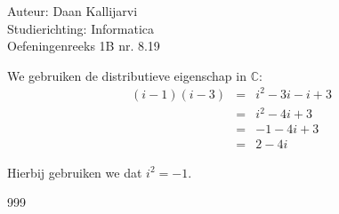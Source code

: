 \documentclass[a4paper]{article}
\begin{document}
\noindent \large Auteur: Daan Kallijarvi \\
\noindent \large Studierichting: Informatica\\
\noindent \large Oefeningenreeks 1B nr. 8.19\\

\medskip

\normalsize

We gebruiken de distributieve eigenschap in $\mathbb{C}$:
\begin{eqnarray*}
(i - 1)(i - 3) 
&=& i^2 - 3i - i + 3 \\
&=& i^2 - 4i + 3 \\
&=& -1 - 4i + 3 \\
&=& 2 - 4i
\end{eqnarray*}

Hierbij gebruiken we dat $i^2 = -1$.

\begin{thebibliography}{999}
\end{thebibliography}
\end{document}

